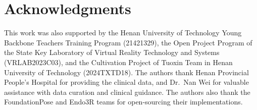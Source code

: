 \documentclass[9pt,twoside,web]{ieeecolor2}
\begin{document}
\section*{Acknowledgments}
This work was also supported by the Henan University of Technology Young Backbone Teachers Training Program (21421329), the Open Project Program of the State Key Laboratory of Virtual Reality Technology and Systems (VRLAB2023C03), and the Cultivation Project of Tuoxin Team in Henan University of Technology (2024TXTD18). The authors thank Henan Provincial People's Hospital for providing the clinical data, and Dr.~Nan Wei for valuable assistance with data curation and clinical guidance. The authors also thank the FoundationPose and Endo3R teams for open-sourcing their implementations.



\end{document}
